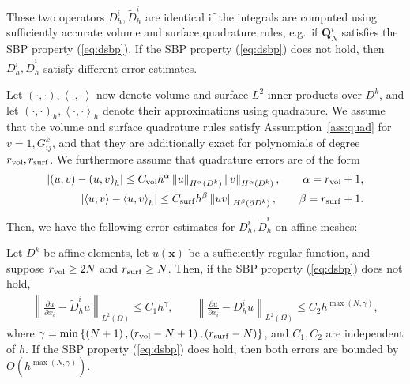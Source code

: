 \documentclass{svjour3}                     %
\renewcommand{\tilde}{\widetilde}
\newcommand{\pd}[2]{\frac{\partial#1}{\partial#2}}
\newcommand{\nor}[1]{\left\| #1 \right\|}
\newcommand{\LRp}[1]{\left( #1 \right)}
\newcommand{\LRa}[1]{\left\langle #1 \right\rangle}
\newcommand{\LRb}[1]{\left| #1 \right|}
\newcommand{\LRc}[1]{\left\{ #1 \right\}}
\begin{document}
These two operators $D^i_h, \tilde{D}^i_h$ are identical if the integrals are computed using sufficiently accurate volume and surface quadrature rules, e.g.\ if $\bm{Q}^i_N$ satisfies the SBP property (\ref{eq:dsbp}).  If the SBP property (\ref{eq:dsbp}) does not hold, then $D^i_h, \tilde{D}^i_h$ satisfy different error estimates.  

Let $\LRp{\cdot,\cdot}, \LRa{\cdot,\cdot}$ now denote volume and surface $L^2$ inner products over $D^k$, and let $\LRp{\cdot,\cdot}_h, \LRa{\cdot,\cdot}_h$ denote their approximations using quadrature.  We assume that the volume and surface quadrature rules satisfy Assumption~\ref{ass:quad} for $v = 1, G^k_{ij}$, and that they are additionally exact for polynomials of degree $r_{\rm vol}, r_{\rm surf}$.  We furthermore assume that quadrature errors are of the form \cite{baker1976effect, brenner2007mathematical}
\begin{align}
\LRb{\LRp{u,v} - \LRp{u,v}_h} \leq C_{\rm vol} h^{\alpha} \nor{u}_{H^{\alpha}\LRp{D^k}}\nor{v}_{H^{\alpha}\LRp{D^k}},\qquad \alpha = r_{\rm vol}+1, \label{eq:quadacc}\\
\LRb{\LRa{u,v} - \LRa{u,v}_h} \leq C_{\rm surf} h^{\beta} \nor{uv}_{H^{\beta}\LRp{\partial D^k}}, \qquad \beta = r_{\rm surf}+1.\nonumber
\end{align}
Then, we have the following error estimates for $D^i_h, \tilde{D}^i_h$ on affine meshes:
\begin{lemma}
Let $D^k$ be affine elements, let $u(\bm{x})$ be a sufficiently regular function, and suppose $r_{\rm vol} \geq 2N$ and $r_{\rm surf} \geq N$.  Then, if the SBP property (\ref{eq:dsbp}) does not hold, 
\begin{align*}
\nor{\pd{u}{x_i} - \tilde{D}^i_h u}_{L^2\LRp{\Omega}} \leq C_1 h^{ \gamma}, \qquad \nor{\pd{u}{x_i} - D^i_h u}_{L^2\LRp{\Omega}} \leq C_2 h^{\max\LRp{N, \gamma}},
\end{align*}
where $\gamma = \min\LRc{\LRp{N+1}, \LRp{r_{\rm vol} - N + 1}, \LRp{r_{\rm surf} - N}}$, and $C_1,C_2$ are independent of $h$.  If the SBP property (\ref{eq:dsbp}) does hold, then both errors are bounded by $O\LRp{h^{\max\LRp{N,\gamma}}}$.
\label{lemma:quadacc}
\end{lemma}
\end{document}
